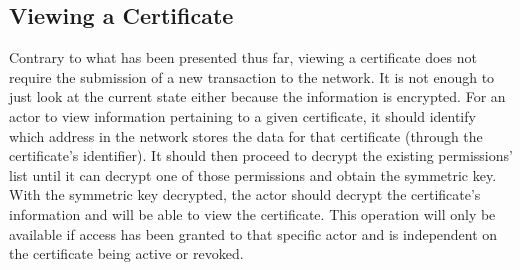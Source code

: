 \subsection{Viewing a Certificate}

Contrary to what has been presented thus far, viewing a certificate does not require the submission of a new transaction to the network. It is not enough to just look at the current state either because the information is encrypted. For an actor to view information pertaining to a given certificate, it should identify which address in the network stores the data for that certificate (through the certificate's identifier). It should then proceed to decrypt the existing permissions' list until it can decrypt one of those permissions and obtain the symmetric key. With the symmetric key decrypted, the actor should decrypt the certificate's information and will be able to view the certificate. This operation will only be available if access has been granted to that specific actor and is independent on the certificate being active or revoked.